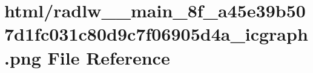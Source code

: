 \hypertarget{radlw____main__8f__a45e39b507d1fc031c80d9c7f06905d4a__icgraph_8png}{}\section{html/radlw\+\_\+\+\_\+main\+\_\+8f\+\_\+a45e39b507d1fc031c80d9c7f06905d4a\+\_\+icgraph.png File Reference}
\label{radlw____main__8f__a45e39b507d1fc031c80d9c7f06905d4a__icgraph_8png}
